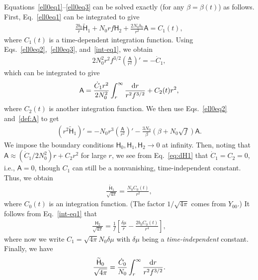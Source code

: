 \documentclass[aps,prd,preprintnumbers,superscriptaddress,nofootinbib,notitlepage]{revtex4-2}
\newcommand*{\D}{{\rm d}}
\begin{document}
Equations~\eqref{ell0eq1}--\eqref{ell0eq3} can be solved exactly
(for any $\beta=\beta(t)$) as follows.
First, Eq.~\eqref{ell0eq1} can be integrated to give 
\begin{align}
    \frac{2b_0}{r}\widetilde{\mathsf{H}}_1+N_0 rf \mathsf{H}_2+\frac{2N_0 b_0}{r^2}\mathsf{A}
    =C_1(t),\label{int-eq1}
\end{align}
where $C_1(t)$ is a time-dependent integration function.
Using Eqs.~\eqref{ell0eq2},~\eqref{ell0eq3}, and~\eqref{int-eq1}, we obtain
\begin{align}
    2N_0^2r^2f^{3/2}\left(\frac{\mathsf{A}}{r^2}\right)'=-\dot{C}_1\label{eq:A},
\end{align}
which can be integrated to give
\begin{align}
    \mathsf{A}=
    \frac{\dot{C}_1 r^2}{2N_0^2}\int^\infty_r \frac{\D r}{r^2f^{3/2}}+C_2 (t)r^2,
\end{align}
where $C_2(t)$ is another integration function.
We then use Eqs.~\eqref{ell0eq2} and~\eqref{def:A} to get 
\begin{align}
    (r^2\widetilde{\mathsf{H}}_1)'=
    -N_0r^3\left(\frac{\mathsf{A}}{r^2}\right)'
    -\frac{3N_0}{\beta}(\beta+N_0\sqrt{f})\mathsf{A}.\label{eq:dH1}
\end{align}
We impose the boundary conditions $\mathsf{H}_0,\mathsf{H}_1,\mathsf{H}_2\to 0$ at infinity.
Then, 
noting that $\mathsf{A}\approx (\dot C_1/2N_0^2)r+C_2r^2$ for large $r$, we see from Eq.~\eqref{eq:dH1} that $\dot C_1=C_2=0$, i.e., $\mathsf{A}=0$,
though $C_1$ can still be a nonvanishing, time-independent constant.
Thus, we obtain
\begin{align}
    \frac{\widetilde{\mathsf H}_1}{\sqrt{4\pi}}=\frac{N_0 C_0(t)}{r^2},
\end{align}
where $C_0(t)$ is an integration function.
(The factor $1/\sqrt{4\pi}$ comes from $Y_{00}$.)
It follows from Eq.~\eqref{int-eq1} that 
\begin{align}
    \frac{\mathsf H_2}{\sqrt{4\pi}}=\frac{1}{f}\left[\frac{\delta\mu}{r}-\frac{2b_0C_0(t)}{r^4}\right],
\end{align}
where now we write $C_1=\sqrt{4\pi}N_0\delta\mu$ with $\delta \mu$ being
a {\em time-independent} constant. Finally, we have
\begin{align}
    \frac{\widetilde{\mathsf{H}}_0}{\sqrt{4\pi}}
    =\frac{\dot{C}_0}{N_0}\int^\infty_r \frac{\D r}{r^2f^{3/2}}.
\end{align}
\end{document}
